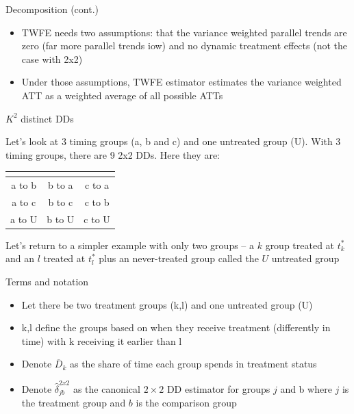 \documentclass{beamer}
\begin{document}
\begin{frame}{Decomposition (cont.)}

\begin{itemize}
\item TWFE needs two assumptions: that the variance weighted parallel trends are zero (far more parallel trends iow) and no dynamic treatment effects (not the case with 2x2)
\item Under those assumptions, TWFE estimator estimates the variance weighted ATT as a weighted average of all possible ATTs
\end{itemize}

\end{frame}


\begin{frame}{$K^2$ distinct DDs}

Let's look at 3 timing groups (a, b and c) and one untreated group (U).  With 3 timing groups, there are 9 2x2 DDs.  Here they are:


\begin{center}
\begin{tabular}{c|c|c}
\multicolumn{1}{l}{} &
\multicolumn{1}{l}{} &
\multicolumn{1}{l}{} \\
\midrule
a to b & b to a & c to a \\
a to c & b to c & c to b \\
a to U & b to U & c to U \\
\midrule
\end{tabular}
\end{center}

\bigskip

Let's return to a simpler example with only two groups -- a $k$ group treated at $t_k^*$ and an $l$ treated at $t_l^*$ plus an never-treated group called the $U$ untreated group
\end{frame} 


\begin{frame}{Terms and notation}

\begin{itemize}
\item Let there be two treatment groups (k,l) and one untreated group (U)
\item k,l define the groups based on when they receive treatment (differently in time) with k receiving it earlier than l
\item Denote $\overline{D}_k$ as the share of time each group spends in treatment status
\item Denote $\widehat{\delta}_{jb}^{2x2}$ as the canonical $2\times 2$ DD estimator for groups $j$ and b where $j$ is the treatment group and $b$ is the comparison group
\end{itemize}

\end{frame}
\end{document}
